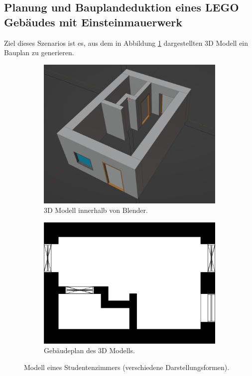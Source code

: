 \subsection{Planung und Bauplandeduktion eines LEGO Gebäudes mit Einsteinmauerwerk}
Ziel dieses Szenarios ist es, aus dem in Abbildung \ref{fig:Scenario1 Screenshot} dargestellten 3D Modell ein Bauplan zu generieren.
\begin{figure}[ht]
  \begin{subfigure}[b]{0.44\columnwidth}
    \includegraphics[width=\columnwidth]{fig/scenario1_screenshot.png}
    \caption{3D Modell innerhalb von Blender.}
    \label{fig:Scenario1 Screenshot}
  \end{subfigure}
  \hfill
  \begin{subfigure}[b]{0.505\columnwidth}
    \includegraphics[width=\columnwidth]{fig/scenario1_story_plan.jpg}
    \caption{Gebäudeplan des 3D Modells.}
    \label{fig:Scenario1 Gebäudeplan}
  \end{subfigure}
  \label{fig:Scenario1 komplett}
  \caption{Modell eines Studentenzimmers (verschiedene Darstellungsformen).}
\end{figure}
